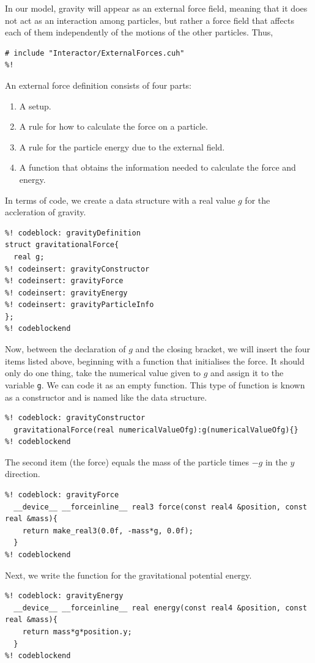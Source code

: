 In our model, gravity will appear as an external force field, meaning that it
does not act as an interaction among particles, but rather a force field that
affects each of them independently of the motions of the other particles. Thus,
\begin{lstlisting}
# include "Interactor/ExternalForces.cuh"
%!
\end{lstlisting}

An external force definition consists of four parts:
\begin{enumerate}
  \item A setup.
  \item A rule for how to calculate the force on a particle.
  \item A rule for the particle energy due to the external field.
  \item A function that obtains the information needed to calculate the force
        and energy.
\end{enumerate}
In terms of code, we create a data structure with a real value $g$ for the
accleration of gravity.
\begin{lstlisting}
%! codeblock: gravityDefinition
struct gravitationalForce{
  real g;
%! codeinsert: gravityConstructor
%! codeinsert: gravityForce
%! codeinsert: gravityEnergy
%! codeinsert: gravityParticleInfo
};
%! codeblockend
\end{lstlisting}
Now, between the declaration of $g$ and the closing bracket, we will insert the
four items listed above, beginning with a function that initialises the force.
It should only do one thing, take the numerical value given to $g$ and assign it
to the variable \texttt{g}. We can code it as an empty function. This type of 
function is known as a constructor and is named like the data structure.
\begin{lstlisting}
%! codeblock: gravityConstructor
  gravitationalForce(real numericalValueOfg):g(numericalValueOfg){}
%! codeblockend
\end{lstlisting}
The second item (the force) equals the mass of the particle times $-g$ in the
$y$ direction.
\begin{lstlisting}
%! codeblock: gravityForce
  __device__ __forceinline__ real3 force(const real4 &position, const real &mass){
    return make_real3(0.0f, -mass*g, 0.0f);
  }
%! codeblockend
\end{lstlisting}
Next, we write the function for the gravitational potential energy.
\begin{lstlisting}
%! codeblock: gravityEnergy
  __device__ __forceinline__ real energy(const real4 &position, const real &mass){
    return mass*g*position.y;
  }
%! codeblockend
\end{lstlisting}
